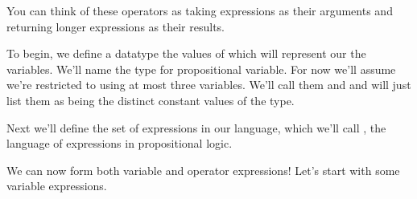 \documentclass[letterpaper,10pt,english]{sphinxmanual}
\begin{document}
\sphinxAtStartPar
You can think of these operators as taking expressions
as their arguments and returning longer expressions as
their results.

\sphinxAtStartPar
To begin, we define a datatype the values of which will
represent our the variables. We’ll name the type 
for propositional variable. For now we’ll assume we’re
restricted to using at most three variables.  We’ll call
them  and  and will just list them as being the
distinct constant values of the  type.

\begin{sphinxVerbatim}[commandchars=\\\{\}]
   
 
 
 

 
\end{sphinxVerbatim}

\sphinxAtStartPar
Next we’ll define the set of expressions in our language,
which we’ll call , the language of expressions
in propositional logic.

\begin{sphinxVerbatim}[commandchars=\\\{\}]
 
    
     
     

 
\end{sphinxVerbatim}

\sphinxAtStartPar
We can now form both variable and operator
expressions! Let’s start with some variable
expressions.

\begin{sphinxVerbatim}[commandchars=\\\{\}]
      
      
      
\end{sphinxVerbatim}
\end{document}
